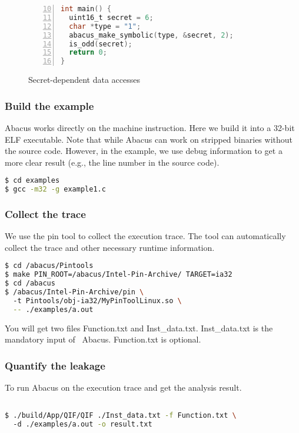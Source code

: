 \documentclass[10pt,conference]{IEEEtran}
\newcommand{\tool}{\textsf{Abacus}}
\begin{document}
\begin{figure}[h]
\begin{lstlisting}[firstnumber=10, xleftmargin=.06\textwidth, xrightmargin=.06\textwidth,numbers=left, frame=single, language=C]
int main() {
  uint16_t secret = 6;
  char *type = "1";
  abacus_make_symbolic(type, &secret, 2); 
  is_odd(secret);
  return 0;
}
\end{lstlisting}
\caption{Secret-dependent data accesses}
\label{fig:example1}
\end{figure}



\subsubsection{Build the example}

Abacus works directly on the machine instruction. Here we build it into 
a 32-bit ELF executable. Note that while Abacus can work on stripped binaries 
without the source code. However, in the example, we use debug information 
to get a more clear result (e.g., the line number in the source code).
\begin{lstlisting}[language=bash]
$ cd examples
$ gcc -m32 -g example1.c
\end{lstlisting}


\subsubsection{Collect the trace}
We use the pin tool to collect the execution trace. The tool can automatically 
collect the trace and other necessary runtime information.
\begin{lstlisting}[language=bash]
$ cd /abacus/Pintools
$ make PIN_ROOT=/abacus/Intel-Pin-Archive/ TARGET=ia32
$ cd /abacus
$ /abacus/Intel-Pin-Archive/pin \ 
  -t Pintools/obj-ia32/MyPinToolLinux.so \
  -- ./examples/a.out 
\end{lstlisting}

You will get two files \textsf{Function.txt} and \textsf{Inst\_data.txt}. \textsf{Inst\_data.txt} is the mandatory input of ~\tool{}. \textsf{Function.txt}
is optional. 

\subsubsection{Quantify the leakage}
To run Abacus on the execution trace and get the analysis result.
\begin{lstlisting}[language=bash]

$ ./build/App/QIF/QIF ./Inst_data.txt -f Function.txt \ 
  -d ./examples/a.out -o result.txt
\end{lstlisting}
\end{document}
